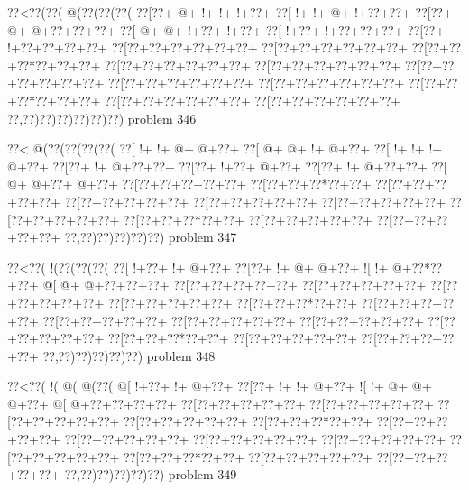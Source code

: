 \vbox{\vbox{\goo
\0??<\0??(\0??(\- @(\0??(\0??(\0??(
\0??[\0??+\- @+\- !+\- !+\- !+\0??+
\0??[\- !+\- !+\- @+\- !+\0??+\0??+
\0??[\0??+\- @+\- @+\0??+\0??+\0??+
\0??[\- @+\- @+\- !+\0??+\- !+\0??+
\0??[\- !+\0??+\- !+\0??+\0??+\0??+
\0??[\0??+\- !+\0??+\0??+\0??+\0??+
\0??[\0??+\0??+\0??+\0??+\0??+\0??+
\0??[\0??+\0??+\0??+\0??+\0??+\0??+
\0??[\0??+\0??+\0??*\0??+\0??+\0??+
\0??[\0??+\0??+\0??+\0??+\0??+\0??+
\0??[\0??+\0??+\0??+\0??+\0??+\0??+
\0??[\0??+\0??+\0??+\0??+\0??+\0??+
\0??[\0??+\0??+\0??+\0??+\0??+\0??+
\0??[\0??+\0??+\0??+\0??+\0??+\0??+
\0??[\0??+\0??+\0??*\0??+\0??+\0??+
\0??[\0??+\0??+\0??+\0??+\0??+\0??+
\0??[\0??+\0??+\0??+\0??+\0??+\0??+
\0??,\0??)\0??)\0??)\0??)\0??)\0??)
}
\hfil problem 346\hfil\break
}

\vbox{\vbox{\goo
\0??<\- @(\0??(\0??(\0??(\0??(
\0??[\- !+\- !+\- @+\- @+\0??+
\0??[\- @+\- @+\- !+\- @+\0??+
\0??[\- !+\- !+\- !+\- @+\0??+
\0??[\0??+\- !+\- @+\0??+\0??+
\0??[\0??+\- !+\0??+\- @+\0??+
\0??[\0??+\- !+\- @+\0??+\0??+
\0??[\- @+\- @+\0??+\- @+\0??+
\0??[\0??+\0??+\0??+\0??+\0??+
\0??[\0??+\0??+\0??*\0??+\0??+
\0??[\0??+\0??+\0??+\0??+\0??+
\0??[\0??+\0??+\0??+\0??+\0??+
\0??[\0??+\0??+\0??+\0??+\0??+
\0??[\0??+\0??+\0??+\0??+\0??+
\0??[\0??+\0??+\0??+\0??+\0??+
\0??[\0??+\0??+\0??*\0??+\0??+
\0??[\0??+\0??+\0??+\0??+\0??+
\0??[\0??+\0??+\0??+\0??+\0??+
\0??,\0??)\0??)\0??)\0??)\0??)
}
\hfil problem 347\hfil\break
}

\vbox{\vbox{\goo
\0??<\0??(\- !(\0??(\0??(\0??(
\0??[\- !+\0??+\- !+\- @+\0??+
\0??[\0??+\- !+\- @+\- @+\0??+
\- ![\- !+\- @+\0??*\0??+\0??+
\- @[\- @+\- @+\0??+\0??+\0??+
\0??[\0??+\0??+\0??+\0??+\0??+
\0??[\0??+\0??+\0??+\0??+\0??+
\0??[\0??+\0??+\0??+\0??+\0??+
\0??[\0??+\0??+\0??+\0??+\0??+
\0??[\0??+\0??+\0??*\0??+\0??+
\0??[\0??+\0??+\0??+\0??+\0??+
\0??[\0??+\0??+\0??+\0??+\0??+
\0??[\0??+\0??+\0??+\0??+\0??+
\0??[\0??+\0??+\0??+\0??+\0??+
\0??[\0??+\0??+\0??+\0??+\0??+
\0??[\0??+\0??+\0??*\0??+\0??+
\0??[\0??+\0??+\0??+\0??+\0??+
\0??[\0??+\0??+\0??+\0??+\0??+
\0??,\0??)\0??)\0??)\0??)\0??)
}
\hfil problem 348\hfil\break
}

\vbox{\vbox{\goo
\0??<\0??(\- !(\- @(\- @(\0??(
\- @[\- !+\0??+\- !+\- @+\0??+
\0??[\0??+\- !+\- !+\- @+\0??+
\- ![\- !+\- @+\- @+\- @+\0??+
\- @[\- @+\0??+\0??+\0??+\0??+
\0??[\0??+\0??+\0??+\0??+\0??+
\0??[\0??+\0??+\0??+\0??+\0??+
\0??[\0??+\0??+\0??+\0??+\0??+
\0??[\0??+\0??+\0??+\0??+\0??+
\0??[\0??+\0??+\0??*\0??+\0??+
\0??[\0??+\0??+\0??+\0??+\0??+
\0??[\0??+\0??+\0??+\0??+\0??+
\0??[\0??+\0??+\0??+\0??+\0??+
\0??[\0??+\0??+\0??+\0??+\0??+
\0??[\0??+\0??+\0??+\0??+\0??+
\0??[\0??+\0??+\0??*\0??+\0??+
\0??[\0??+\0??+\0??+\0??+\0??+
\0??[\0??+\0??+\0??+\0??+\0??+
\0??,\0??)\0??)\0??)\0??)\0??)
}
\hfil problem 349\hfil\break
}

